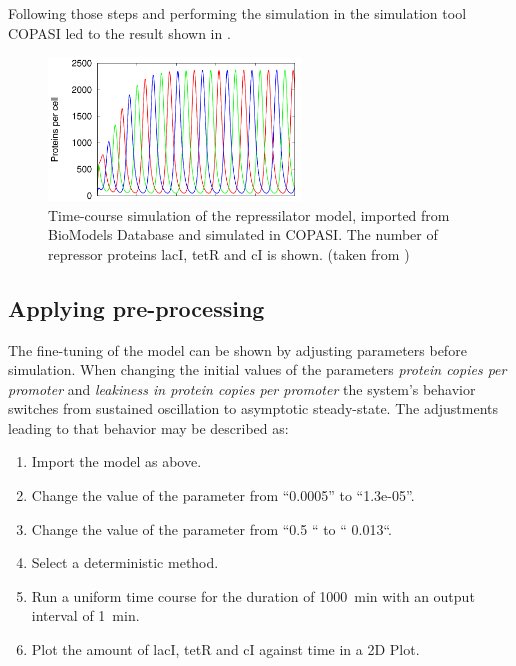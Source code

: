 Following those steps and performing the simulation in the simulation tool COPASI \citep{Hoops:2006} led to the result shown in . 

\begin{figure}
\centering
\includegraphics[width=0.6\textwidth]{images/simEx1.png}
\caption{Time-course simulation of the repressilator model, imported from BioModels Database and simulated in COPASI. The number of repressor proteins lacI, tetR and cI is shown. (taken from \cite{Waltemath:2011})}
\label{fig:simEx1}
\end{figure}

\subsection{Applying pre-processing}
\label{sec:examplePreprocessing}
The fine-tuning of the model can be shown by adjusting parameters before simulation. When changing the initial values of the parameters \emph{protein copies per promoter} and \emph{leakiness in protein copies per promoter} the system's behavior switches from sustained oscillation to asymptotic steady-state. The adjustments leading to that behavior may be described as: 

\begin{enumerate}
\item{Import the model as above.}
\item{Change the value of the parameter  from “0.0005” to “1.3e-05”. }
\item{Change the value of the parameter  from “0.5 “ to “ 0.013“.}
\item{Select a deterministic method.}
\item{Run a uniform time course for the duration of 1000~min with an output interval of 1~min.}
\item Plot the amount of lacI, tetR and cI against time in a 2D Plot.
\end{enumerate}

